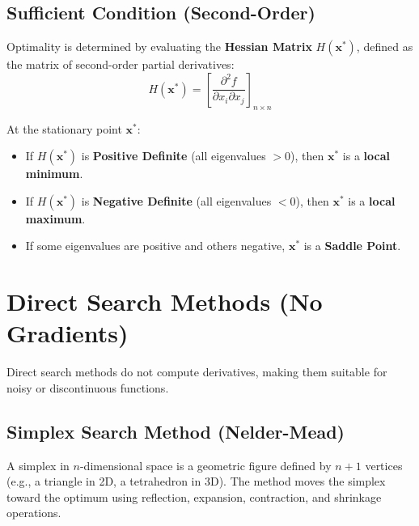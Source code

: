 \documentclass[12pt,a4paper]{article}
\begin{document}
\subsection{Sufficient Condition (Second-Order)}
Optimality is determined by evaluating the \textbf{Hessian Matrix} $H(\mathbf{x}^*)$, defined as the matrix of second-order partial derivatives:
\begin{equation}
  H(\mathbf{x}^*) = \left[ \frac{\partial^2 f}{\partial x_i \partial x_j} \right]_{n \times n}
\end{equation}

\begin{tcolorbox}[defbox, title={Theorem: Multivariable Sufficient Condition}]
At the stationary point $\mathbf{x}^*$:
\begin{itemize}[leftmargin=*, itemsep=2.5pt, topsep=0pt]
  \item If $H(\mathbf{x}^*)$ is \textbf{Positive Definite} (all eigenvalues $> 0$), then $\mathbf{x}^*$ is a \textbf{local minimum}.
  \item If $H(\mathbf{x}^*)$ is \textbf{Negative Definite} (all eigenvalues $< 0$), then $\mathbf{x}^*$ is a \textbf{local maximum}.
  \item If some eigenvalues are positive and others negative, $\mathbf{x}^*$ is a \textbf{Saddle Point}.
\end{itemize}
\end{tcolorbox}

\section{Direct Search Methods (No Gradients)}

Direct search methods do not compute derivatives, making them suitable for noisy or discontinuous functions.

\subsection{Simplex Search Method (Nelder-Mead)}
A simplex in $n$-dimensional space is a geometric figure defined by $n+1$ vertices (e.g., a triangle in 2D, a tetrahedron in 3D). The method moves the simplex toward the optimum using reflection, expansion, contraction, and shrinkage operations.
\end{document}
